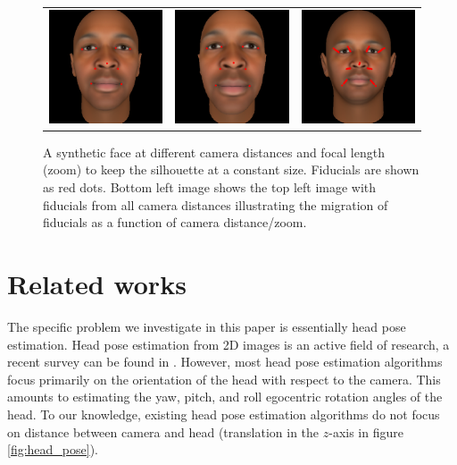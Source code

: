 \documentclass[runningheads]{llncs}
\begin{document}
\begin{figure}[ht]
\begin{tabular}{ccc}
\includegraphics[width=.25\linewidth]{resources/figures/extracted_fiducial_0005.png} &
\includegraphics[width=.25\linewidth]{resources/figures/extracted_fiducial_0007.png} &
\includegraphics[width=.25\linewidth]{resources/figures/fiducial_migration.png}
\end{tabular}
\caption{A synthetic face at different camera distances and focal length (zoom) to keep the silhouette at a constant size.  
Fiducials are shown as red dots.  
Bottom left image shows the top left image with fiducials from all camera distances illustrating the migration of fiducials as a function of camera distance/zoom.} 
\label{fig:fiducial_migration}
\end{figure}

\section{Related works}
The specific problem we investigate in this paper is essentially head pose estimation.  
Head pose estimation from 2D images is an active field of research, a recent survey can be found in \cite{murphy2009head}. 
However, most head pose estimation algorithms focus primarily on the orientation of the head with respect to the camera. 
This amounts to estimating the yaw, pitch, and roll egocentric rotation angles of the head. 
To our knowledge, existing head pose estimation algorithms do not focus on distance between camera and head (translation in the $z$-axis in figure \ref{fig:head_pose}).
\end{document}
